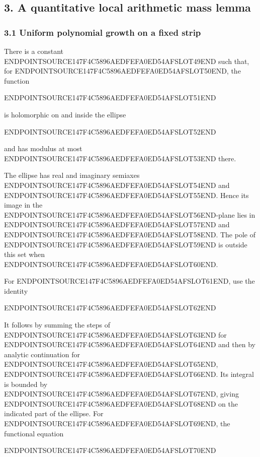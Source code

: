 \subsection{3. A quantitative local arithmetic mass lemma}\label{endpoint-arithmetic_original--a-quantitative-local-arithmetic-mass-lemma}

\subsubsection{3.1 Uniform polynomial growth on a fixed strip}\label{endpoint-arithmetic_original--uniform-polynomial-growth-on-a-fixed-strip}

There is a constant ENDPOINTSOURCE147F4C5896AEDFEFA0ED54AFSLOT49END such that, for ENDPOINTSOURCE147F4C5896AEDFEFA0ED54AFSLOT50END, the function

ENDPOINTSOURCE147F4C5896AEDFEFA0ED54AFSLOT51END

is holomorphic on and inside the ellipse

ENDPOINTSOURCE147F4C5896AEDFEFA0ED54AFSLOT52END

and has modulus at most ENDPOINTSOURCE147F4C5896AEDFEFA0ED54AFSLOT53END there.

The ellipse has real and imaginary semiaxes ENDPOINTSOURCE147F4C5896AEDFEFA0ED54AFSLOT54END and ENDPOINTSOURCE147F4C5896AEDFEFA0ED54AFSLOT55END. Hence its image in the ENDPOINTSOURCE147F4C5896AEDFEFA0ED54AFSLOT56END-plane lies in ENDPOINTSOURCE147F4C5896AEDFEFA0ED54AFSLOT57END and ENDPOINTSOURCE147F4C5896AEDFEFA0ED54AFSLOT58END. The pole of ENDPOINTSOURCE147F4C5896AEDFEFA0ED54AFSLOT59END is outside this set when ENDPOINTSOURCE147F4C5896AEDFEFA0ED54AFSLOT60END.

For ENDPOINTSOURCE147F4C5896AEDFEFA0ED54AFSLOT61END, use the identity

ENDPOINTSOURCE147F4C5896AEDFEFA0ED54AFSLOT62END

It follows by summing the steps of ENDPOINTSOURCE147F4C5896AEDFEFA0ED54AFSLOT63END for ENDPOINTSOURCE147F4C5896AEDFEFA0ED54AFSLOT64END and then by analytic continuation for ENDPOINTSOURCE147F4C5896AEDFEFA0ED54AFSLOT65END, ENDPOINTSOURCE147F4C5896AEDFEFA0ED54AFSLOT66END. Its integral is bounded by ENDPOINTSOURCE147F4C5896AEDFEFA0ED54AFSLOT67END, giving ENDPOINTSOURCE147F4C5896AEDFEFA0ED54AFSLOT68END on the indicated part of the ellipse. For ENDPOINTSOURCE147F4C5896AEDFEFA0ED54AFSLOT69END, the functional equation

ENDPOINTSOURCE147F4C5896AEDFEFA0ED54AFSLOT70END

